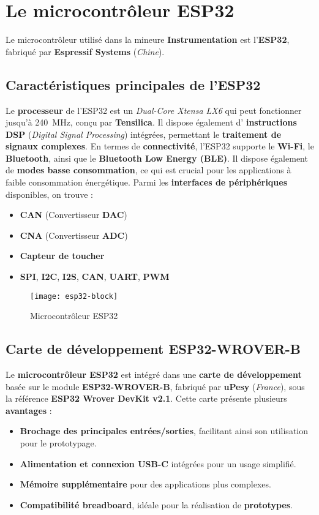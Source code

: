 \section{Le microcontrôleur ESP32}

Le microcontrôleur utilisé dans la mineure \textbf{Instrumentation} est 
l'\textbf{ESP32}, fabriqué par \textbf{Espressif Systems} (\textit{Chine}).

\subsection{Caractéristiques principales de l'ESP32}
Le \textbf{processeur} de l'ESP32 est un \textit{Dual-Core Xtensa LX6} qui peut 
fonctionner jusqu'à \SI{240}{\mega\hertz}, conçu par \textbf{Tensilica}. Il
dispose également d' \textbf{instructions DSP} (\textit{Digital Signal Processing}) 
intégrées, permettant le \textbf{traitement de signaux complexes}. En termes de 
\textbf{connectivité}, l'ESP32 supporte le \textbf{Wi-Fi}, le \textbf{Bluetooth}, 
ainsi que le \textbf{Bluetooth Low Energy (BLE)}. Il dispose également de 
\textbf{modes basse consommation}, ce qui est crucial pour les applications à 
faible consommation énergétique. Parmi les \textbf{interfaces de périphériques} 
disponibles, on trouve :
\begin{itemize}
    \item \textbf{CAN} (Convertisseur \textbf{DAC})
    \item \textbf{CNA} (Convertisseur \textbf{ADC})
    \item \textbf{Capteur de toucher}
    \item \textbf{SPI}, \textbf{I2C}, \textbf{I2S}, \textbf{CAN}, \textbf{UART}, \textbf{PWM}
\end{itemize}

\begin{figure}[!ht]
    \centering
    \texttt{[image: esp32-block]}
    \caption{Microcontrôleur ESP32}
    \label{fig:esp32}
\end{figure}

\subsection{Carte de développement ESP32-WROVER-B}
Le \textbf{microcontrôleur ESP32} est intégré dans une \textbf{carte de développement} basée sur le module \textbf{ESP32-WROVER-B}, fabriqué par \textbf{uPesy} (\textit{France}), sous la référence \textbf{ESP32 Wrover DevKit v2.1}. Cette carte présente plusieurs \textbf{avantages} :
\begin{itemize}
    \item \textbf{Brochage des principales entrées/sorties}, facilitant ainsi son utilisation pour le prototypage.
    \item \textbf{Alimentation et connexion USB-C} intégrées pour un usage simplifié.
    \item \textbf{Mémoire supplémentaire} pour des applications plus complexes.
    \item \textbf{Compatibilité breadboard}, idéale pour la réalisation de \textbf{prototypes}.
\end{itemize}


